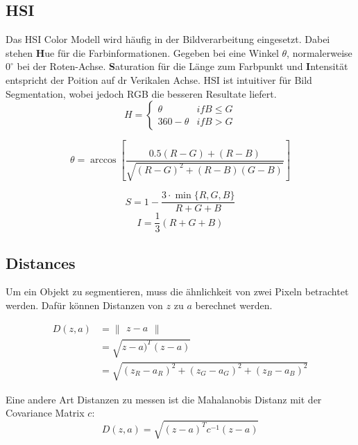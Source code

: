 \subsection{HSI}
Das HSI Color Modell wird häufig in der Bildverarbeitung eingesetzt. Dabei stehen \textbf{H}ue für die Farbinformationen. Gegeben bei eine Winkel $\theta$, normalerweise $0^\circ$ bei der Roten-Achse. \textbf{S}aturation für die Länge zum Farbpunkt und \textbf{I}ntensität entspricht der Poition auf dr Verikalen Achse. HSI ist intuitiver für Bild Segmentation, wobei jedoch RGB die besseren Resultate liefert.
\[
H = \begin{cases}
	\theta & if B \le G \\
	360 - \theta & if B \gt G 
\end{cases}
\]


\[
\theta = \arccos\left[\frac{0.5(R- G) + (R-B)}{\sqrt{(R-G)^2 + (R-B)(G-B)}}\right]
\]

\[
S = 1 - \frac{3\cdot \min\{R,G,B\}}{R+G+B}
\]
\[
I = \frac{1}{3}(R+G+B)
\]

\subsection{Distances}
Um ein Objekt zu segmentieren, muss die ähnlichkeit von zwei Pixeln betrachtet werden. Dafür können Distanzen von $z$ zu $a$ berechnet werden.

\begin{align*}
	D(z,a) &= \begin{Vmatrix}z - a\end{Vmatrix} \\
	& = \sqrt{z-a)^T(z-a)} \\
	& = \sqrt{(z_R-a_R)^2+(z_G-a_G)^2+(z_B-a_B)^2}
\end{align*}

Eine andere Art Distanzen zu messen ist die Mahalanobis Distanz mit der Covariance Matrix $c$:
\[
D(z,a)=\sqrt{(z-a)^Tc^{-1}(z-a)}
\]